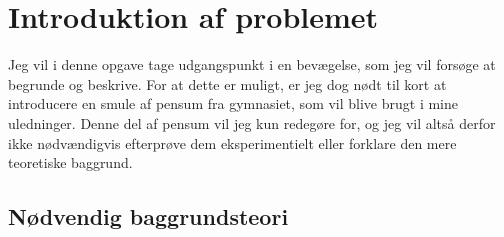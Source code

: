 \chapter{Introduktion af problemet}
Jeg vil i denne opgave tage udgangspunkt i en bevægelse, som jeg vil forsøge at begrunde og beskrive. 
For at dette er muligt, er jeg dog nødt til kort at introducere en smule af pensum fra gymnasiet, som vil blive brugt i mine uledninger. 
Denne del af pensum vil jeg kun redegøre for, og jeg vil altså derfor ikke nødvændigvis efterprøve dem eksperimentielt eller forklare den mere teoretiske baggrund. 

\section{Nødvendig baggrundsteori}